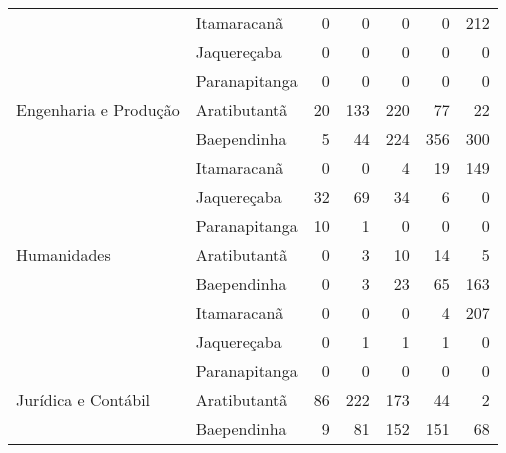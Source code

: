 \begin{table}[ht]
\begin{tabular}{ll rrrrr}
                          & Itamaracanã             &                  0 &            0 &           0 &          0 &              212 \\ 
                          & Jaquereçaba             &                  0 &            0 &           0 &          0 &                0 \\ 
                          & Paranapitanga           &                  0 &            0 &           0 &          0 &                0 \\ 
  Engenharia e Produção   & Aratibutantã            &                 20 &          133 &         220 &         77 &               22 \\ 
                          & Baependinha             &                  5 &           44 &         224 &        356 &              300 \\ 
                          & Itamaracanã             &                  0 &            0 &           4 &         19 &              149 \\ 
                          & Jaquereçaba             &                 32 &           69 &          34 &          6 &                0 \\ 
                          & Paranapitanga           &                 10 &            1 &           0 &          0 &                0 \\ 
  Humanidades             & Aratibutantã            &                  0 &            3 &          10 &         14 &                5 \\ 
                          & Baependinha             &                  0 &            3 &          23 &         65 &              163 \\ 
                          & Itamaracanã             &                  0 &            0 &           0 &          4 &              207 \\ 
                          & Jaquereçaba             &                  0 &            1 &           1 &          1 &                0 \\ 
                          & Paranapitanga           &                  0 &            0 &           0 &          0 &                0 \\ 
  Jurídica e Contábil     & Aratibutantã            &                 86 &          222 &         173 &         44 &                2 \\ 
                          & Baependinha             &                  9 &           81 &         152 &        151 &               68 \\ 

\end{tabular}
\end{table}
